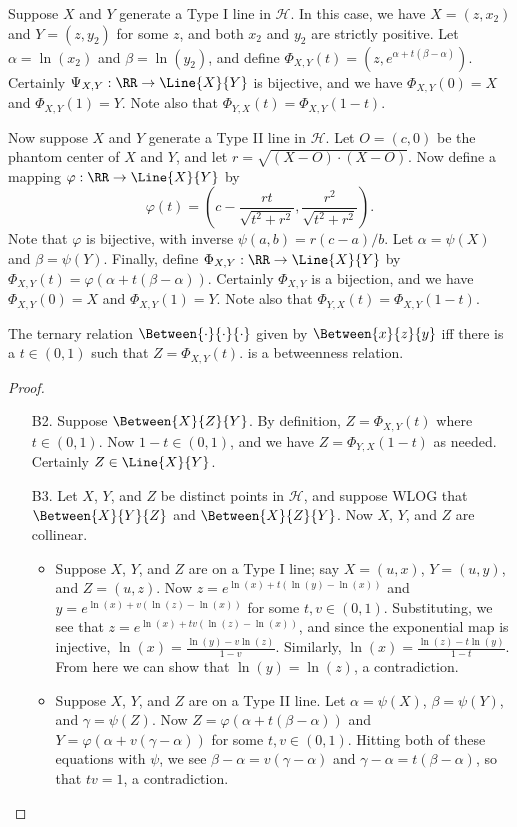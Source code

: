 \documentclass{article}
\begin{document}
Suppose $X$ and $Y$ generate a Type I line in $\mathcal{H}$. In this case, we have $X = (z,x_2)$ and $Y = (z,y_2)$ for some $z$, and both $x_2$ and $y_2$ are strictly positive. Let $\alpha = \ln(x_2)$ and $\beta = \ln(y_2)$, and define $\Phi_{X,Y}(t) = (z, e^{\alpha + t(\beta - \alpha)})$. Certainly $\Psi_{X,Y} : \RR \rightarrow \Line{X}{Y}$ is bijective, and we have $\Phi_{X,Y}(0) = X$ and $\Phi_{X,Y}(1) = Y$. Note also that $\Phi_{Y,X}(t) = \Phi_{X,Y}(1-t)$.

Now suppose $X$ and $Y$ generate a Type II line in $\mathcal{H}$. Let $O = (c,0)$ be the phantom center of $X$ and $Y$, and let $r = \sqrt{(X-O) \cdot (X-O)}$. Now define a mapping $\varphi : \RR \rightarrow \Line{X}{Y}$ by \[ \varphi(t) = \left(c - \frac{rt}{\sqrt{t^2 + r^2}}, \frac{r^2}{\sqrt{t^2 + r^2}} \right).\] Note that $\varphi$ is bijective, with inverse $\psi(a,b) = r(c-a)/b$. Let $\alpha = \psi(X)$ and $\beta = \psi(Y)$. Finally, define $\Phi_{X,Y} : \RR \rightarrow \Line{X}{Y}$ by $\Phi_{X,Y}(t) = \varphi(\alpha + t(\beta - \alpha))$. Certainly $\Phi_{X,Y}$ is a bijection, and we have $\Phi_{X,Y}(0) = X$ and $\Phi_{X,Y}(1) = Y$. Note also that $\Phi_{Y,X}(t) = \Phi_{X,Y}(1-t)$.

\begin{prop}
The ternary relation $\Between{\cdot}{\cdot}{\cdot}$ given by $\Between{x}{z}{y}$ iff there is a $t \in (0,1)$ such that $Z = \Phi_{X,Y}(t)$. is a betweenness relation.
\end{prop}

\begin{proof} \mbox{}
\begin{itemize}
\item[B2.] Suppose $\Between{X}{Z}{Y}$. By definition, $Z = \Phi_{X,Y}(t)$ where $t \in (0,1)$. Now $1-t \in (0,1)$, and we have $Z = \Phi_{Y,X}(1-t)$ as needed. Certainly $Z \in \Line{X}{Y}$.
\item[B3.] Let $X$, $Y$, and $Z$ be distinct points in $\mathcal{H}$, and suppose WLOG that $\Between{X}{Y}{Z}$ and $\Between{X}{Z}{Y}$. Now $X$, $Y$, and $Z$ are collinear.
\begin{itemize}
\item Suppose $X$, $Y$, and $Z$ are on a Type I line; say $X = (u,x)$, $Y = (u,y)$, and $Z = (u,z)$. Now $z = e^{\ln(x) + t(\ln(y) - \ln(x))}$ and $y = e^{\ln(x) + v(\ln(z) - \ln(x))}$ for some $t,v \in (0,1)$. Substituting, we see that $z = e^{\ln(x) + tv(\ln(z) - \ln(x))}$, and since the exponential map is injective, $\ln(x) = \frac{\ln(y) - v\ln(z)}{1-v}$. Similarly, $\ln(x) = \frac{\ln(z) - t\ln(y)}{1-t}$. From here we can show that $\ln(y) = \ln(z)$, a contradiction.
\item Suppose $X$, $Y$, and $Z$ are on a Type II line. Let $\alpha = \psi(X)$, $\beta = \psi(Y)$, and $\gamma = \psi(Z)$. Now $Z = \varphi(\alpha + t(\beta - \alpha))$ and $Y = \varphi(\alpha + v(\gamma - \alpha))$ for some $t,v \in (0,1)$. Hitting both of these equations with $\psi$, we see $\beta - \alpha = v(\gamma - \alpha)$ and $\gamma - \alpha = t(\beta - \alpha)$, so that $tv = 1$, a contradiction.
\end{itemize}
\end{itemize}
\end{proof}
\end{document}
